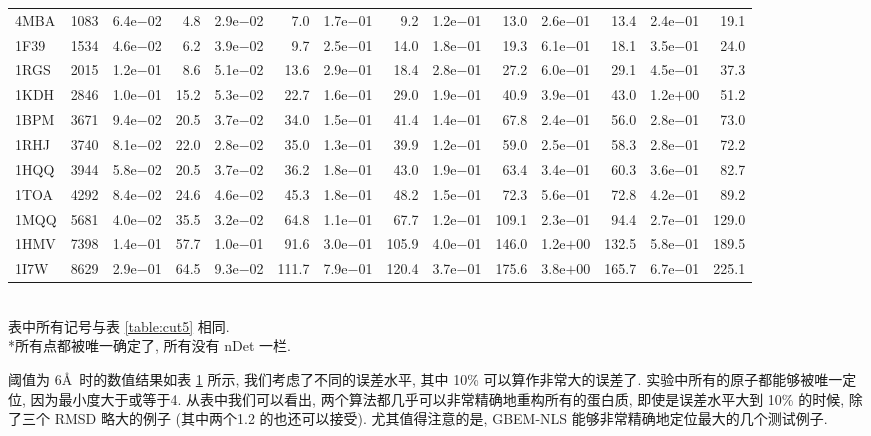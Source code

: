 \begin{table}[!htbp]
{\begin{tabular}{lrrrrrrrrrrrrr}
      4MBA & 1083 & 6.4e$-$02 &  4.8 & 2.9e$-$02 &   7.0 & 1.7e$-$01 &   9.2 & 1.2e$-$01&  13.0 & 2.6e$-$01 &  13.4 & 2.4e$-$01&  19.1  \\
      1F39 & 1534 & 4.6e$-$02 &  6.2 & 3.9e$-$02 &   9.7 & 2.5e$-$01 &  14.0 & 1.8e$-$01&  19.3 & 6.1e$-$01 &  18.1 & 3.5e$-$01&  24.0  \\
      1RGS & 2015 & 1.2e$-$01 &  8.6 & 5.1e$-$02 &  13.6 & 2.9e$-$01 &  18.4 & 2.8e$-$01&  27.2 & 6.0e$-$01 &  29.1 & 4.5e$-$01&  37.3  \\
      1KDH & 2846 & 1.0e$-$01 & 15.2 & 5.3e$-$02 &  22.7 & 1.6e$-$01 &  29.0 & 1.9e$-$01&  40.9 & 3.9e$-$01 &  43.0 & 1.2e$+$00&  51.2  \\
      1BPM & 3671 & 9.4e$-$02 & 20.5 & 3.7e$-$02 &  34.0 & 1.5e$-$01 &  41.4 & 1.4e$-$01&  67.8 & 2.4e$-$01 &  56.0 & 2.8e$-$01&  73.0  \\
      1RHJ & 3740 & 8.1e$-$02 & 22.0 & 2.8e$-$02 &  35.0 & 1.3e$-$01 &  39.9 & 1.2e$-$01&  59.0 & 2.5e$-$01 &  58.3 & 2.8e$-$01&  72.2  \\
      1HQQ & 3944 & 5.8e$-$02 & 20.5 & 3.7e$-$02 &  36.2 & 1.8e$-$01 &  43.0 & 1.9e$-$01&  63.4 & 3.4e$-$01 &  60.3 & 3.6e$-$01&  82.7  \\
      1TOA & 4292 & 8.4e$-$02 & 24.6 & 4.6e$-$02 &  45.3 & 1.8e$-$01 &  48.2 & 1.5e$-$01&  72.3 & 5.6e$-$01 &  72.8 & 4.2e$-$01&  89.2  \\
      1MQQ & 5681 & 4.0e$-$02 & 35.5 & 3.2e$-$02 &  64.8 & 1.1e$-$01 &  67.7 & 1.2e$-$01& 109.1 & 2.3e$-$01 &  94.4 & 2.7e$-$01& 129.0  \\
      1HMV & 7398 & 1.4e$-$01 & 57.7 & 1.0e$-$01 &  91.6 & 3.0e$-$01 & 105.9 & 4.0e$-$01& 146.0 & 1.2e$+$00 & 132.5 & 5.8e$-$01& 189.5  \\
      1I7W & 8629 & 2.9e$-$01 & 64.5 & 9.3e$-$02 & 111.7 & 7.9e$-$01 & 120.4 & 3.7e$-$01& 175.6 & 3.8e$+$00 & 165.7 & 6.7e$-$01& 225.1  \\
      \toprule
    \end{tabular}\\[-4mm]
    \label{table:cut6}                                                                  \bl *表中所有记号与表 \ref{table:cut5} 相同. \\
    *所有点都被唯一确定了, 所有没有 nDet 一栏.
    \el
  }
\end{table}

阈值为 6\AA~时的数值结果如表 \ref{table:cut6} 所示, 
我们考虑了不同的误差水平, 其中 10\% 可以算作非常大的误差了.
实验中所有的原子都能够被唯一定位, 因为最小度大于或等于4.
从表中我们可以看出, 两个算法都几乎可以非常精确地重构所有的蛋白质,
即使是误差水平大到 10\% 的时候, 除了三个 RMSD 略大的例子 
(其中两个1.2 的也还可以接受).
尤其值得注意的是, GBEM-NLS 能够非常精确地定位最大的几个测试例子.

